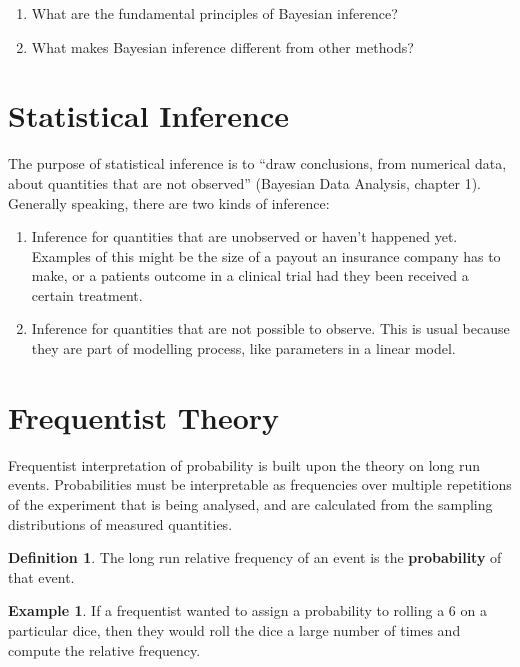 \documentclass[
]{book}
\providecommand{\tightlist}{%
  \setlength{\itemsep}{0pt}\setlength{\parskip}{0pt}}
\theoremstyle{definition}
\newtheorem{definition}{Definition}[chapter]
\theoremstyle{definition}
\newtheorem{example}{Example}[chapter]
\theoremstyle{definition}
\theoremstyle{definition}
\theoremstyle{remark}
\begin{document}
\begin{enumerate}
\def\labelenumi{\arabic{enumi}.}
\item
  What are the fundamental principles of Bayesian inference?
\item
  What makes Bayesian inference different from other methods?
\end{enumerate}

\section{Statistical Inference}\label{statistical-inference}

The purpose of statistical inference is to ``draw conclusions, from numerical data, about quantities that are not observed'' (Bayesian Data Analysis, chapter 1). Generally speaking, there are two kinds of inference:

\begin{enumerate}
\def\labelenumi{\arabic{enumi}.}
\tightlist
\item
  Inference for quantities that are unobserved or haven't happened yet. Examples of this might be the size of a payout an insurance company has to make, or a patients outcome in a clinical trial had they been received a certain treatment.
\item
  Inference for quantities that are not possible to observe. This is usual because they are part of modelling process, like parameters in a linear model.
\end{enumerate}

\section{Frequentist Theory}\label{frequentist-theory}

Frequentist interpretation of probability is built upon the theory on long run events. Probabilities must be interpretable as frequencies over multiple repetitions of the experiment that is being analysed, and are calculated from the sampling distributions of measured quantities.

\begin{definition}
The long run relative frequency of an event is the \textbf{probability} of that event.
\end{definition}

\begin{example}
If a frequentist wanted to assign a probability to rolling a 6 on a particular dice, then they would roll the dice a large number of times and compute the relative frequency.
\end{example}
\end{document}
